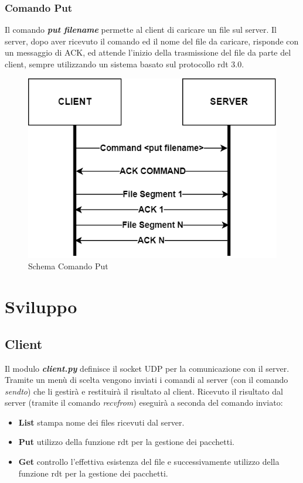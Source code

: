 \documentclass{article}
\begin{document}
\subsubsection{Comando Put}


Il comando \textbf{\emph{put filename}} permette al client di caricare un file sul server. Il server, dopo aver ricevuto il comando ed il nome del file da caricare, risponde con un messaggio di ACK,
ed attende l'inizio della trasmissione del file da parte del client, sempre utilizzando un sistema basato sul protocollo rdt 3.0.

\begin{figure}[!htb]
  \includegraphics[width=\linewidth]{commandPut.png}
  \caption{Schema Comando Put}
\end{figure}

\newpage
\section{Sviluppo}
\subsection{Client}


Il modulo \textbf{\emph{client.py}} definisce il socket UDP per la comunicazione con il server.
Tramite un menù di scelta vengono inviati i comandi al server (con il comando  \textit{sendto}) che li gestirà e restituirà il risultato al client.
Ricevuto il risultato dal server (tramite il comando \textit{recvfrom}) eseguirà a seconda del comando inviato:
\begin{itemize}
    \item \textbf{List} stampa nome dei files ricevuti dal server.
    \item \textbf{Put} utilizzo della funzione rdt per la gestione dei pacchetti.
    \item \textbf{Get} controllo l'effettiva esistenza del file e successivamente utilizzo della funzione rdt per la gestione dei pacchetti.
\end{itemize}
\end{document}
